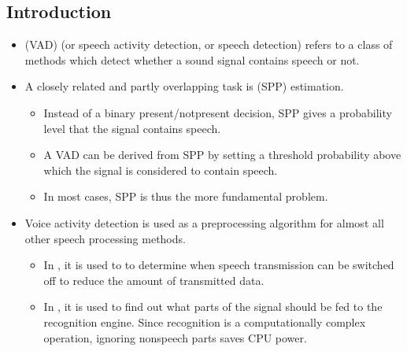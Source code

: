 \documentclass[letterpaper,10pt,english]{jupyterBook}
\begin{document}
\subsection{Introduction}
\label{\detokenize{Recognition/Voice_activity_detection:introduction}}
\sphinxAtStartPar
{}
\begin{itemize}
\item {} 
\sphinxAtStartPar
{} (VAD) (or speech activity detection, or
speech detection) refers to a class of methods which detect whether
a sound signal contains speech or not.

\item {} 
\sphinxAtStartPar
A closely related and partly overlapping task is  (SPP) estimation.
\begin{itemize}
\item {} 
\sphinxAtStartPar
Instead of a binary present/not\sphinxhyphen{}present decision, SPP gives a
probability level that the signal contains speech.

\item {} 
\sphinxAtStartPar
A VAD can be derived from SPP by setting a threshold probability
above which the signal is considered to contain speech.

\item {} 
\sphinxAtStartPar
In most cases, SPP is thus the more fundamental problem.

\end{itemize}

\item {} 
\sphinxAtStartPar
Voice activity detection is used as a pre\sphinxhyphen{}processing algorithm for
almost all other speech processing methods.
\begin{itemize}
\item {} 
\sphinxAtStartPar
In , it is used to to determine when speech
transmission can be switched off to reduce the amount of
transmitted data.

\item {} 
\sphinxAtStartPar
In , it is used to find out what parts of
the signal should be fed to the recognition engine. Since
recognition is a computationally complex operation, ignoring
non\sphinxhyphen{}speech parts saves CPU power.

\end{itemize}


\end{itemize}
\end{document}
